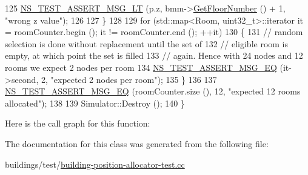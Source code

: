 \begin{DoxyCode}
125       \hyperlink{group__testing_ga1d96848b91407c9a0b36583e8b0ad7ae}{NS\_TEST\_ASSERT\_MSG\_LT} (p.z, bmm->\hyperlink{classns3_1_1MobilityBuildingInfo_aedb2647206f2dae0aa98ec9ac11873c7}{GetFloorNumber} () + 1, \textcolor{stringliteral}{"wrong z
       value"});
126 
127     \}
128 
129   \textcolor{keywordflow}{for} (std::map<Room, uint32\_t>::iterator it = roomCounter.begin (); it != roomCounter.end (); ++it)
130     \{
131       \textcolor{comment}{// random selection is done without replacement until the set of}
132       \textcolor{comment}{// eligible room is empty, at which point the set is filled}
133       \textcolor{comment}{// again. Hence with 24 nodes and 12 rooms we expect 2 nodes per room}
134       \hyperlink{group__testing_ga2a9d78cffb3db8e867c35fff0b698cf5}{NS\_TEST\_ASSERT\_MSG\_EQ} (it->second, 2, \textcolor{stringliteral}{"expected 2 nodes per room"});
135     \}
136 
137   \hyperlink{group__testing_ga2a9d78cffb3db8e867c35fff0b698cf5}{NS\_TEST\_ASSERT\_MSG\_EQ} (roomCounter.size (), 12, \textcolor{stringliteral}{"expected 12 rooms allocated"});
138 
139   Simulator::Destroy ();
140 \}
\end{DoxyCode}


Here is the call graph for this function\+:




The documentation for this class was generated from the following file\+:\begin{DoxyCompactItemize}
\item 
buildings/test/\hyperlink{building-position-allocator-test_8cc}{building-\/position-\/allocator-\/test.\+cc}\end{DoxyCompactItemize}

